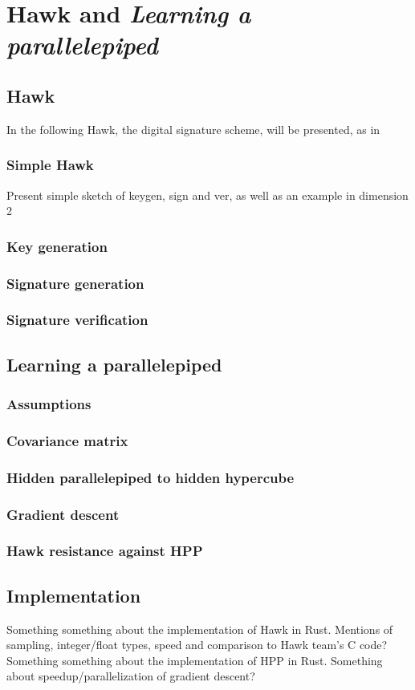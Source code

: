 \chapter{Hawk and \textit{Learning a parallelepiped}}

\section{Hawk}
In the following Hawk, the digital signature scheme, will be presented, as in \cite{hawkspec}
\subsection{Simple Hawk}
Present simple sketch of keygen, sign and ver, as well as an example in dimension 2
\subsection{Key generation}
\subsection{Signature generation}
\subsection{Signature verification}

\section{Learning a parallelepiped}
\subsection{Assumptions}
\subsection{Covariance matrix}
\subsection{Hidden parallelepiped to hidden hypercube}
\subsection{Gradient descent}
\subsection{Hawk resistance against HPP}

\section{Implementation}
Something something about the implementation of Hawk in Rust.
Mentions of sampling, integer/float types, speed and comparison to Hawk team's C code? \hfill \break \\
Something something about the implementation of HPP in Rust. Something about speedup/parallelization of gradient descent?
